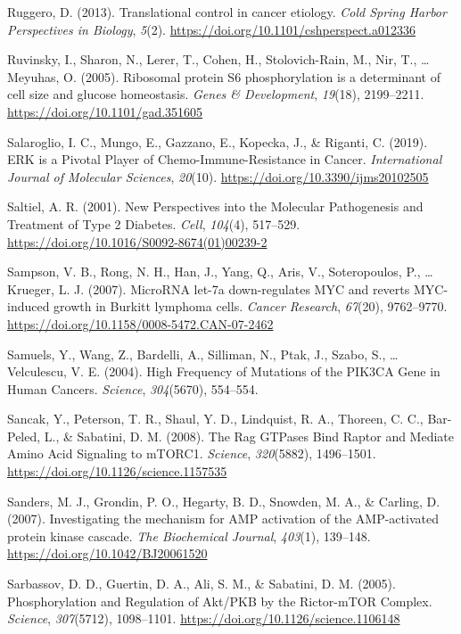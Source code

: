 \documentclass[12pt,openany]{book}
\begin{document}
\hypertarget{ref-Ruggero2013}{}
Ruggero, D. (2013). Translational control in cancer etiology. \emph{Cold
Spring Harbor Perspectives in Biology}, \emph{5}(2).
\url{https://doi.org/10.1101/cshperspect.a012336}

\hypertarget{ref-Ruvinsky2005}{}
Ruvinsky, I., Sharon, N., Lerer, T., Cohen, H., Stolovich-Rain, M., Nir,
T., \ldots{} Meyuhas, O. (2005). Ribosomal protein S6 phosphorylation is
a determinant of cell size and glucose homeostasis. \emph{Genes \&
Development}, \emph{19}(18), 2199--2211.
\url{https://doi.org/10.1101/gad.351605}

\hypertarget{ref-Salaroglio2019}{}
Salaroglio, I. C., Mungo, E., Gazzano, E., Kopecka, J., \& Riganti, C.
(2019). ERK is a Pivotal Player of Chemo-Immune-Resistance in Cancer.
\emph{International Journal of Molecular Sciences}, \emph{20}(10).
\url{https://doi.org/10.3390/ijms20102505}

\hypertarget{ref-Saltiel2001}{}
Saltiel, A. R. (2001). New Perspectives into the Molecular Pathogenesis
and Treatment of Type 2 Diabetes. \emph{Cell}, \emph{104}(4), 517--529.
\url{https://doi.org/10.1016/S0092-8674(01)00239-2}

\hypertarget{ref-Sampson2007}{}
Sampson, V. B., Rong, N. H., Han, J., Yang, Q., Aris, V., Soteropoulos,
P., \ldots{} Krueger, L. J. (2007). MicroRNA let-7a down-regulates MYC
and reverts MYC-induced growth in Burkitt lymphoma cells. \emph{Cancer
Research}, \emph{67}(20), 9762--9770.
\url{https://doi.org/10.1158/0008-5472.CAN-07-2462}

\hypertarget{ref-Samuels2004}{}
Samuels, Y., Wang, Z., Bardelli, A., Silliman, N., Ptak, J., Szabo, S.,
\ldots{} Velculescu, V. E. (2004). High Frequency of Mutations of the
PIK3CA Gene in Human Cancers. \emph{Science}, \emph{304}(5670),
554--554.

\hypertarget{ref-Sancak2008}{}
Sancak, Y., Peterson, T. R., Shaul, Y. D., Lindquist, R. A., Thoreen, C.
C., Bar-Peled, L., \& Sabatini, D. M. (2008). The Rag GTPases Bind
Raptor and Mediate Amino Acid Signaling to mTORC1. \emph{Science},
\emph{320}(5882), 1496--1501.
\url{https://doi.org/10.1126/science.1157535}

\hypertarget{ref-Sanders2007}{}
Sanders, M. J., Grondin, P. O., Hegarty, B. D., Snowden, M. A., \&
Carling, D. (2007). Investigating the mechanism for AMP activation of
the AMP-activated protein kinase cascade. \emph{The Biochemical
Journal}, \emph{403}(1), 139--148.
\url{https://doi.org/10.1042/BJ20061520}

\hypertarget{ref-Sarbassov2005}{}
Sarbassov, D. D., Guertin, D. A., Ali, S. M., \& Sabatini, D. M. (2005).
Phosphorylation and Regulation of Akt/PKB by the Rictor-mTOR Complex.
\emph{Science}, \emph{307}(5712), 1098--1101.
\url{https://doi.org/10.1126/science.1106148}
\end{document}
